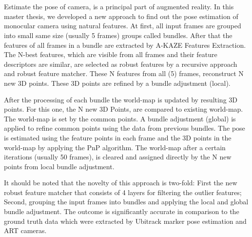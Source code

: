 \chapter{\abstractname}
Estimate the pose of camera, is a principal part of augmented reality. In this master thesis, we developed a new approach to find out the pose estimation of monocular camera using natural features. At first, all input frames are grouped into small same size (usually 5 frames) groups called bundles. After that the features of all frames in a bundle are extracted by A-KAZE Features Extraction. The N-best features, which are visible from all frames and their feature descriptors are similar, are selected as robust features by a recursive approach and robust feature matcher. These N features from all (5) frames, reconstruct N new 3D points. These 3D points are refined by a bundle adjustment (local).

After the processing of each bundle the world-map is updated by resulting 3D points. For this one, the N new 3D Points, are compared to existing world-map. The world-map is set by the common points. A bundle adjustment (global) is applied to refine common points using the data from previous bundles. The pose is estimated using the feature points in each frame and the 3D points in the world-map by applying the PnP algorithm. The world-map after a certain iterations (usually 50 frames), is cleared and assigned directly by the N new points from local bundle adjustment.

It should be noted that the novelty of this approach is two-fold: First the new robust feature matcher that consists of 4 layers for filtering the outlier features; Second, grouping the input frames into bundles and applying the local and global bundle adjustment. The outcome is significantly accurate in comparison to the ground truth data which were extracted by Ubitrack marker pose estimation and ART cameras.